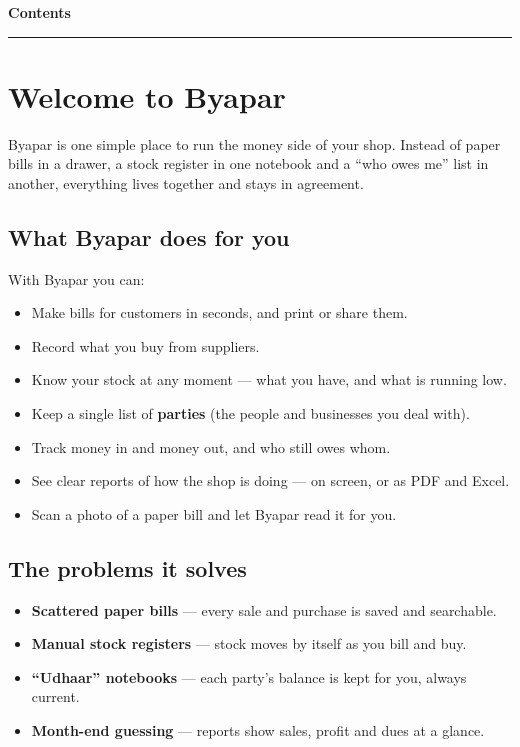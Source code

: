 \documentclass[11pt,a4paper,openany]{report}
\begin{document}
{\sffamily\bfseries\color{navy}\Huge Contents}\par\vspace{10pt}
{\color{brandgreen}\rule{\linewidth}{1.2pt}}\par\vspace{4pt}
\makeatletter
{}
\makeatother
\clearpage
{}

\chapter{Welcome to Byapar}
Byapar is one simple place to run the money side of your shop. Instead of paper
bills in a drawer, a stock register in one notebook and a ``who owes me'' list in
another, everything lives together and stays in agreement.

\section{What Byapar does for you}
With Byapar you can:
\begin{itemize}[leftmargin=1.3em,itemsep=2pt]
  \item Make bills for customers in seconds, and print or share them.
  \item Record what you buy from suppliers.
  \item Know your stock at any moment — what you have, and what is running low.
  \item Keep a single list of \textbf{parties} (the people and businesses you deal with).
  \item Track money in and money out, and who still owes whom.
  \item See clear reports of how the shop is doing — on screen, or as PDF and Excel.
  \item Scan a photo of a paper bill and let Byapar read it for you.
\end{itemize}

\section{The problems it solves}
\begin{itemize}[leftmargin=1.3em,itemsep=2pt]
  \item \textbf{Scattered paper bills} — every sale and purchase is saved and searchable.
  \item \textbf{Manual stock registers} — stock moves by itself as you bill and buy.
  \item \textbf{``Udhaar'' notebooks} — each party's balance is kept for you, always current.
  \item \textbf{Month-end guessing} — reports show sales, profit and dues at a glance.
\end{itemize}
\end{document}

